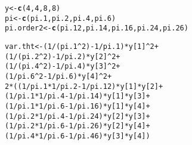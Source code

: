 \documentclass[12pt]{article}\usepackage[]{graphicx}\usepackage[]{color}
\makeatletter
\newcommand{\hlnum}[1]{\textcolor[rgb]{0.686,0.059,0.569}{#1}}%
\newcommand{\hlopt}[1]{\textcolor[rgb]{0,0,0}{#1}}%
\newcommand{\hlstd}[1]{\textcolor[rgb]{0.345,0.345,0.345}{#1}}%
\newcommand{\hlkwb}[1]{\textcolor[rgb]{0.69,0.353,0.396}{#1}}%
\newcommand{\hlkwd}[1]{\textcolor[rgb]{0.737,0.353,0.396}{\textbf{#1}}}%
\newenvironment{kframe}{%
 \def\at@end@of@kframe{}%
 \ifinner\ifhmode%
  \def\at@end@of@kframe{\end{minipage}}%
  \begin{minipage}{\columnwidth}%
 \fi\fi%
 \def\FrameCommand##1{\hskip\@totalleftmargin \hskip-\fboxsep
 \colorbox{shadecolor}{##1}\hskip-\fboxsep
     \hskip-\linewidth \hskip-\@totalleftmargin \hskip\columnwidth}%
 \MakeFramed {\advance\hsize-\width
   \@totalleftmargin\z@ \linewidth\hsize
   \@setminipage}}%
 {\par\unskip\endMakeFramed%
 \at@end@of@kframe}
\newenvironment{knitrout}{}{} %
\makeatother
\begin{document}
\begin{doublespacing}
\begin{enumerate}
\begin{enumerate}
\begin{singlespace}
\begin{knitrout}\footnotesize
{}\color{fgcolor}\begin{kframe}
\begin{alltt}
\hlstd{y} \hlkwb{<-} \hlkwd{c}\hlstd{(}\hlnum{4}\hlstd{,} \hlnum{4}\hlstd{,} \hlnum{8}\hlstd{,} \hlnum{8}\hlstd{)}
\hlstd{pi} \hlkwb{<-} \hlkwd{c}\hlstd{(pi.1, pi.2, pi.4, pi.6)}
\hlstd{pi.order2} \hlkwb{<-} \hlkwd{c}\hlstd{(pi.12, pi.14, pi.16, pi.24, pi.26)}

\hlstd{var.tht} \hlkwb{<-} \hlstd{(}\hlnum{1}\hlopt{/}\hlstd{(pi.1}\hlopt{^}\hlnum{2}\hlstd{)} \hlopt{-} \hlnum{1}\hlopt{/}\hlstd{pi.1)}\hlopt{*}\hlstd{y[}\hlnum{1}\hlstd{]}\hlopt{^}\hlnum{2} \hlopt{+}
  \hlstd{(}\hlnum{1}\hlopt{/}\hlstd{(pi.2}\hlopt{^}\hlnum{2}\hlstd{)} \hlopt{-} \hlnum{1}\hlopt{/}\hlstd{pi.2)}\hlopt{*}\hlstd{y[}\hlnum{2}\hlstd{]}\hlopt{^}\hlnum{2} \hlopt{+}
  \hlstd{(}\hlnum{1}\hlopt{/}\hlstd{(pi.4}\hlopt{^}\hlnum{2}\hlstd{)} \hlopt{-} \hlnum{1}\hlopt{/}\hlstd{pi.4)}\hlopt{*}\hlstd{y[}\hlnum{3}\hlstd{]}\hlopt{^}\hlnum{2} \hlopt{+}
  \hlstd{(}\hlnum{1}\hlopt{/}\hlstd{pi.6}\hlopt{^}\hlnum{2} \hlopt{-} \hlnum{1}\hlopt{/}\hlstd{pi.6)}\hlopt{*}\hlstd{y[}\hlnum{4}\hlstd{]}\hlopt{^}\hlnum{2} \hlopt{+}
  \hlnum{2}\hlopt{*}\hlstd{((}\hlnum{1}\hlopt{/}\hlstd{pi.1}\hlopt{*}\hlnum{1}\hlopt{/}\hlstd{pi.2}\hlopt{-}\hlnum{1}\hlopt{/}\hlstd{pi.12)}\hlopt{*}\hlstd{y[}\hlnum{1}\hlstd{]}\hlopt{*}\hlstd{y[}\hlnum{2}\hlstd{]}\hlopt{+}
  \hlstd{(}\hlnum{1}\hlopt{/}\hlstd{pi.1}\hlopt{*}\hlnum{1}\hlopt{/}\hlstd{pi.4}\hlopt{-}\hlnum{1}\hlopt{/}\hlstd{pi.14)}\hlopt{*}\hlstd{y[}\hlnum{1}\hlstd{]}\hlopt{*}\hlstd{y[}\hlnum{3}\hlstd{]} \hlopt{+}
    \hlstd{(}\hlnum{1}\hlopt{/}\hlstd{pi.1}\hlopt{*}\hlnum{1}\hlopt{/}\hlstd{pi.6} \hlopt{-} \hlnum{1}\hlopt{/}\hlstd{pi.16)}\hlopt{*}\hlstd{y[}\hlnum{1}\hlstd{]}\hlopt{*}\hlstd{y[}\hlnum{4}\hlstd{]} \hlopt{+}
    \hlstd{(}\hlnum{1}\hlopt{/}\hlstd{pi.2}\hlopt{*}\hlnum{1}\hlopt{/}\hlstd{pi.4}\hlopt{-}\hlnum{1}\hlopt{/}\hlstd{pi.24)}\hlopt{*}\hlstd{y[}\hlnum{2}\hlstd{]}\hlopt{*}\hlstd{y[}\hlnum{3}\hlstd{]} \hlopt{+}
    \hlstd{(}\hlnum{1}\hlopt{/}\hlstd{pi.2}\hlopt{*}\hlnum{1}\hlopt{/}\hlstd{pi.6}\hlopt{-}\hlnum{1}\hlopt{/}\hlstd{pi.26)}\hlopt{*}\hlstd{y[}\hlnum{2}\hlstd{]}\hlopt{*}\hlstd{y[}\hlnum{4}\hlstd{]} \hlopt{+}
  \hlstd{(}\hlnum{1}\hlopt{/}\hlstd{pi.4}\hlopt{*}\hlnum{1}\hlopt{/}\hlstd{pi.6} \hlopt{-} \hlnum{1}\hlopt{/}\hlstd{pi.46)}\hlopt{*}\hlstd{y[}\hlnum{3}\hlstd{]}\hlopt{*}\hlstd{y[}\hlnum{4}\hlstd{])}
\end{alltt}
\end{kframe}
\end{knitrout}
\end{singlespace}


\end{enumerate}

\end{enumerate}

\end{doublespacing}
\end{document}
